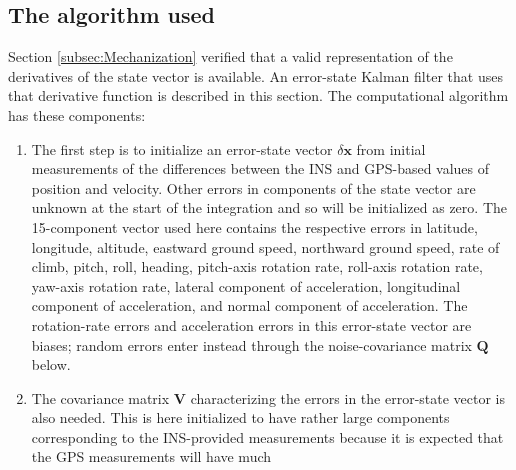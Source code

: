 \documentclass[12pt,twoside,english,12pt,twoside,english]{article}\usepackage[]{graphicx}\usepackage[]{color}
\let\OrgIndex\index
\renewcommand*{\index}[1]{\OrgIndex{#1}}
\begin{document}
\subsection{The algorithm used}

Section
\ref{subsec:Mechanization} verified that a valid representation of
the derivatives of the state vector
is available.
An error-state Kalman filter that
uses that derivative function is described in this section. The computational
algorithm has these components: 

\begin{enumerate}
\item The first step is to initialize an error-state vector
$\delta\mathbf{x}$ from initial measurements
of the differences between the INS and GPS-based
values of position and velocity. Other errors in components of the
state vector are unknown at the start of the integration and so will
be initialized as zero. The 15-component vector used here contains
the respective errors in latitude, longitude,
altitude, eastward ground speed, northward
ground speed, rate of climb, pitch, roll, heading, pitch-axis rotation
rate, roll-axis rotation rate, yaw-axis rotation rate, lateral
component of acceleration,  longitudinal
component of acceleration, and normal component of acceleration. The
rotation-rate errors and acceleration
errors
in this error-state vector are biases;
random errors enter instead through the noise-covariance matrix
$\mathbf{Q}$ below.
\item The covariance matrix
$\mathbf{V}$ characterizing the errors in the error-state vector
is also needed. This is here initialized to have rather large components
corresponding to the INS-provided
measurements because it is expected that the GPS
measurements will have much

\end{enumerate}
\end{document}
